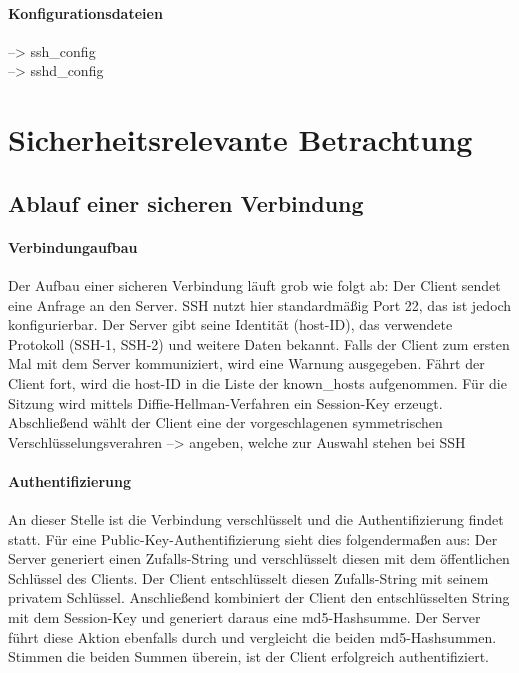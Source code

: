 \documentclass[ngerman,pdf]{wkcms}    %
\begin{document}
\paragraph{Konfigurationsdateien}

--> ssh\_config \\
--> sshd\_config \\



\section{Sicherheitsrelevante Betrachtung}


\subsection{Ablauf einer sicheren Verbindung}\label{sec:ablauf}

\paragraph{Verbindungaufbau}
Der Aufbau einer sicheren Verbindung läuft grob wie folgt ab: Der Client sendet eine Anfrage an den Server. SSH nutzt hier standardmäßig Port 22, das ist jedoch konfigurierbar. Der Server gibt seine Identität (host-ID), das verwendete Protokoll (SSH-1, SSH-2) und weitere Daten bekannt. Falls der Client zum ersten Mal mit dem Server kommuniziert, wird eine Warnung ausgegeben. Fährt der Client fort, wird die host-ID in die Liste der \IT known\_hosts aufgenommen. Für die Sitzung wird mittels Diffie-Hellman-Verfahren ein Session-Key erzeugt. Abschließend wählt der Client eine der vorgeschlagenen symmetrischen Verschlüsselungsverahren --> angeben, welche zur Auswahl stehen bei SSH

\paragraph{Authentifizierung}
An dieser Stelle ist die Verbindung verschlüsselt und die Authentifizierung findet statt. Für eine Public-Key-Authentifizierung sieht dies folgendermaßen aus: Der Server generiert einen Zufalls-String und verschlüsselt diesen mit dem öffentlichen Schlüssel des Clients. Der Client entschlüsselt diesen Zufalls-String mit seinem privatem Schlüssel. Anschließend kombiniert der Client den entschlüsselten String mit dem Session-Key und generiert daraus eine md5-Hashsumme. Der Server führt diese Aktion ebenfalls durch und vergleicht die beiden md5-Hashsummen. Stimmen die beiden Summen überein, ist der Client erfolgreich authentifiziert. \cite[S. 64]{SSH} \cite{man_ssh}
\end{document}
